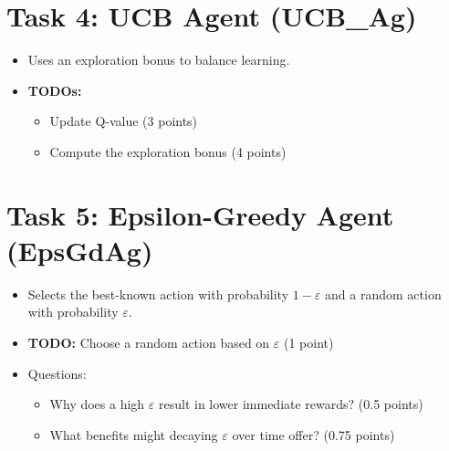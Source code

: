 \documentclass[12pt]{article}
\begin{document}
{{{\section{Task 4: UCB Agent (UCB\_Ag)}
\begin{itemize}[noitemsep]
    \item Uses an exploration bonus to balance learning.
    \item \textbf{TODOs:}
    \begin{itemize}[noitemsep]
        \item Update Q-value (3 points)
        \item Compute the exploration bonus (4 points)
    \end{itemize}
\end{itemize}

\section{Task 5: Epsilon-Greedy Agent (EpsGdAg)}
\begin{itemize}[noitemsep]
    \item Selects the best-known action with probability \(1-\varepsilon\) and a random action with probability \(\varepsilon\).
    \item \textbf{TODO:} Choose a random action based on \(\varepsilon\) (1 point)
    \item Questions:
    \begin{itemize}[noitemsep]
        \item Why does a high \(\varepsilon\) result in lower immediate rewards? (0.5 points)
        \item What benefits might decaying \(\varepsilon\) over time offer? (0.75 points)
    \end{itemize}
\end{itemize}

}}}
\end{document}
